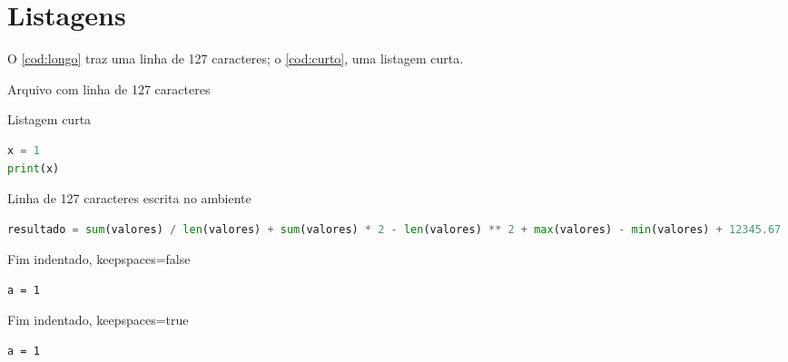 \documentclass{abntex2-ufv}
\begin{document}
\textual
\chapter{Listagens}
O \autoref{cod:longo} traz uma linha de 127 caracteres; o \autoref{cod:curto}, uma listagem curta.

\begin{codigo}[htbp]
\begin{ilustracao}[\linewidth]{\caption{Arquivo com linha de 127 caracteres}\label{cod:longo}}{\elaboracaopropria}

\end{ilustracao}
\end{codigo}

\begin{codigo}[htbp]
\begin{ilustracao}[\linewidth]{\caption{Listagem curta}\label{cod:curto}}{\elaboracaopropria}
\begin{lstlisting}[language=Python]
x = 1
print(x)
\end{lstlisting}
\end{ilustracao}
\end{codigo}

\begin{codigo}[htbp]
\begin{ilustracao}[\linewidth]{\caption{Linha de 127 caracteres escrita no ambiente}\label{cod:inline}}{\elaboracaopropria}
\begin{lstlisting}[language=Python]
resultado = sum(valores) / len(valores) + sum(valores) * 2 - len(valores) ** 2 + max(valores) - min(valores) + 12345.67
\end{lstlisting}
\end{ilustracao}
\end{codigo}

\lstset{keepspaces=false}
\begin{codigo}[htbp]
\begin{ilustracao}[\linewidth]{\caption{Fim indentado, keepspaces=false}\label{cod:ks-f}}{\elaboracaopropria}
  \begin{lstlisting}
a = 1
  \end{lstlisting}
\end{ilustracao}
\end{codigo}
\lstset{keepspaces=true}
\begin{codigo}[htbp]
\begin{ilustracao}[\linewidth]{\caption{Fim indentado, keepspaces=true}\label{cod:ks-t}}{\elaboracaopropria}
  \begin{lstlisting}
a = 1
  \end{lstlisting}
\end{ilustracao}
\end{codigo}
\end{document}

